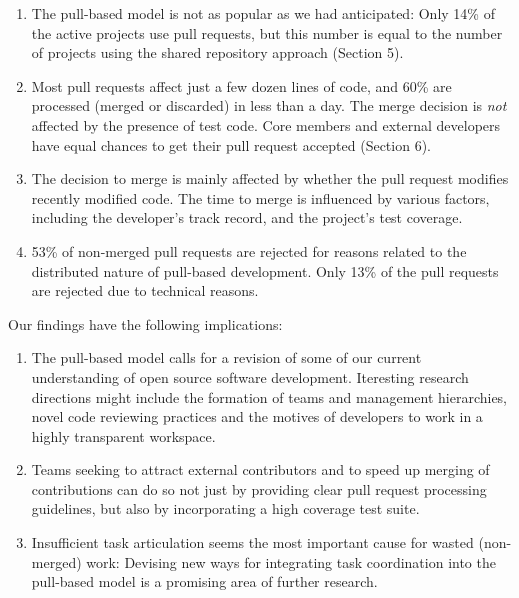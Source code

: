 \documentclass{sig-alternate}
\begin{document}
\begin{enumerate}

  \item The pull-based model is not as popular as we had anticipated: Only 14\%
    of the active projects use pull requests, but this number is equal to the
    number of projects using the shared repository approach (Section 5).

  \item Most pull requests affect just a few dozen lines of code, and 60\% are
    processed (merged or discarded) in less than a day. The merge decision is
    \emph{not} affected by the presence of test code. Core members and external
    developers have equal chances to get their pull request accepted (Section
    6).

  \item The decision to merge is mainly affected by whether the pull request
    modifies recently modified code. The time to merge is influenced by various
    factors, including the developer's track record, and the project's test
    coverage.

  \item 53\% of non-merged pull requests are rejected for reasons related to the
    distributed nature of pull-based development. Only 13\% of the pull requests
    are rejected due to technical reasons.

\end{enumerate}

Our findings have the following implications:

\begin{enumerate}

  \item The pull-based model calls for a revision of some of our current
    understanding of open source software development. Iteresting research
    directions might include the formation of teams and management hierarchies,
    novel code reviewing practices and the motives of developers to work in a
    highly transparent workspace.

  \item Teams seeking to attract external contributors and to speed up merging
    of contributions can do so not just by providing clear pull request
    processing guidelines, but also by incorporating a high coverage test suite.

  \item Insufficient task articulation seems the most important cause for wasted
    (non-merged) work: Devising new ways for integrating task coordination into
    the pull-based model is a promising area of further research.

\end{enumerate}
\end{document}
